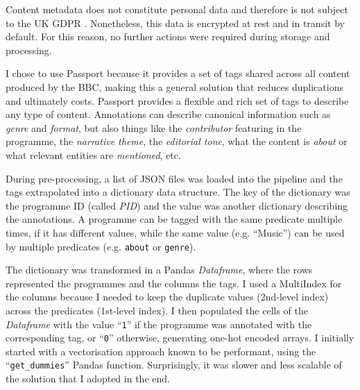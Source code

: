 
Content metadata does not constitute personal data and therefore is not subject to the UK GDPR  \cite{UKGDPR}.
Nonetheless, this data is encrypted at rest and in transit by default.
For this reason, no further actions were required during storage and processing.


I chose to use Passport because it provides a set of tags shared across all content produced by the BBC,
making this a general solution that reduces duplications and ultimately costs. Passport provides a flexible and rich set of tags
to describe any type of content. Annotations can describe canonical information such as \textit{genre} and \textit{format}, but also things like the \textit{contributor}
featuring in the programme, the \textit{narrative theme}, the \textit{editorial tone}, what the content is \textit{about}
or what relevant entities are \textit{mentioned}, etc.


During pre-processing, a list of JSON files was loaded into the pipeline and the tags extrapolated into a dictionary data structure.
The key of the dictionary was the programme ID (called \textit{PID}) and the value was another dictionary describing the annotations.
A programme can be tagged with the same predicate multiple times, if it has different values,
while the same value (e.g. ``Music'') can be used by multiple predicates (e.g. \verb|about| or \verb|genre|).

The dictionary was transformed in a Pandas \textit{Dataframe}, where the rows represented the programmes and the columns the tags.
I used a MultiIndex \cite{Pandas:MultiIndex} for the columns because I needed to keep the duplicate values (2nd-level index) across the predicates
(1st-level index).
I then populated the cells of the \textit{Dataframe} with the value ``\verb|1|'' if the programme was annotated with the corresponding tag,
or ``\verb|0|'' otherwise, generating one-hot encoded arrays. I initially started with a vectorisation approach known to be performant,
using the ``\verb|get_dummies|'' Pandas function. Surprisingly, it was slower and less scalable of the solution that
I adopted in the end.

